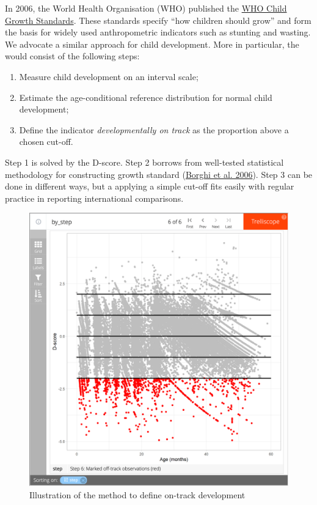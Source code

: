 \documentclass[
]{book}
\providecommand{\tightlist}{%
  \setlength{\itemsep}{0pt}\setlength{\parskip}{0pt}}
\begin{document}
In 2006, the World Health Organisation (WHO) published the \href{https://www.who.int/childgrowth/publications/technical_report_pub/en/}{WHO Child Growth Standards}. These standards specify ``how children should grow'' and form the basis for widely used anthropometric indicators such as stunting and wasting. We advocate a similar approach for child development. More in particular, the would consist of the following steps:

\begin{enumerate}
\def\labelenumi{\arabic{enumi}.}
\tightlist
\item
  Measure child development on an interval scale;
\item
  Estimate the age-conditional reference distribution for normal child development;
\item
  Define the indicator \emph{developmentally on track} as the proportion above a chosen cut-off.
\end{enumerate}

Step 1 is solved by the D-score. Step 2 borrows from well-tested statistical methodology for constructing growth standard (\protect\hyperlink{ref-borghi2006}{Borghi et al. 2006}). Step 3 can be done in different ways, but a applying a simple cut-off fits easily with regular practice in reporting international comparisons.

\begin{figure}

{\centering \includegraphics[width=1\linewidth]{fig/fig_7.1} 

}

\caption{Illustration of the method to define on-track development}\label{fig:dscorerefs}
\end{figure}
\end{document}
